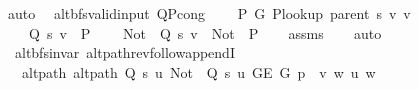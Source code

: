 \begin{isabellebody}
\ auto%
\endisatagproof
{\isafoldproof}%
%
\isadelimproof
\isanewline
%
\endisadelimproof
%
\isadeliminvisible
\isanewline
%
\endisadeliminvisible
%
\isataginvisible
{}\isamarkupfalse%
\ {\isacharparenleft}{\kern0pt}\ alt{\isacharunderscore}{\kern0pt}bfs{\isacharunderscore}{\kern0pt}valid{\isacharunderscore}{\kern0pt}input{\isacharparenright}{\kern0pt}\ Q{\isacharunderscore}{\kern0pt}P{\isacharprime}{\kern0pt}{\isacharprime}{\kern0pt}{\isacharunderscore}{\kern0pt}cong{\isacharunderscore}{\kern0pt}{}{\isacharcolon}{\kern0pt}\isanewline
\ \ \ {\isachardoublequoteopen}{\isasymnot}\ P{\isacharprime}{\kern0pt}\ G{}\ {\isacharparenleft}{\kern0pt}P{\isacharunderscore}{\kern0pt}lookup\ {\isacharparenleft}{\kern0pt}parent\ s{\isacharparenright}{\kern0pt}\ v{\isacharparenright}{\kern0pt}\ v{\isachardoublequoteclose}\isanewline
\ \ \isanewline
\ \ \ \ {\isachardoublequoteopen}Q\ s\ v\ {\isacharequal}{\kern0pt}\ P{\isacharprime}{\kern0pt}{\isacharprime}{\kern0pt}{\isachardoublequoteclose}\isanewline
\ \ \ \ {\isachardoublequoteopen}{\isacharparenleft}{\kern0pt}Not\ {\isasymcirc}\ Q\ s\ v{\isacharparenright}{\kern0pt}\ {\isacharequal}{\kern0pt}\ {\isacharparenleft}{\kern0pt}Not\ {\isasymcirc}\ P{\isacharprime}{\kern0pt}{\isacharprime}{\kern0pt}{\isacharparenright}{\kern0pt}{\isachardoublequoteclose}%
\endisataginvisible
{\isafoldinvisible}%
%
\isadeliminvisible
\isanewline
%
\endisadeliminvisible
%
\isadelimproof
\ \ %
\endisadelimproof
%
\isatagproof
{}\isamarkupfalse%
\ assms\isanewline
\ \ \isamarkupfalse%
\ auto%
\endisatagproof
{\isafoldproof}%
%
\isadelimproof
\isanewline
%
\endisadelimproof
\isanewline
{}\isamarkupfalse%
\ {\isacharparenleft}{\kern0pt}\ alt{\isacharunderscore}{\kern0pt}bfs{\isacharunderscore}{\kern0pt}invar{\isacharparenright}{\kern0pt}\ alt{\isacharunderscore}{\kern0pt}path{\isacharunderscore}{\kern0pt}rev{\isacharunderscore}{\kern0pt}follow{\isacharunderscore}{\kern0pt}appendI{\isacharcolon}{\kern0pt}\isanewline
\ \ \ alt{\isacharunderscore}{\kern0pt}path{\isacharcolon}{\kern0pt}\ {\isachardoublequoteopen}alt{\isacharunderscore}{\kern0pt}path\ {\isacharparenleft}{\kern0pt}Q\ s\ u{\isacharparenright}{\kern0pt}\ {\isacharparenleft}{\kern0pt}Not\ {\isasymcirc}\ Q\ s\ u{\isacharparenright}{\kern0pt}\ {\isacharparenleft}{\kern0pt}G{\isachardot}{\kern0pt}E\ G{\isacharparenright}{\kern0pt}\ {\isacharparenleft}{\kern0pt}p\ {\isacharat}{\kern0pt}\ {\isacharbrackleft}{\kern0pt}v{\isacharcomma}{\kern0pt}\ w{\isacharbrackright}{\kern0pt}{\isacharparenright}{\kern0pt}\ u\ w{\isachardoublequoteclose}\isanewline

\end{isabellebody}

